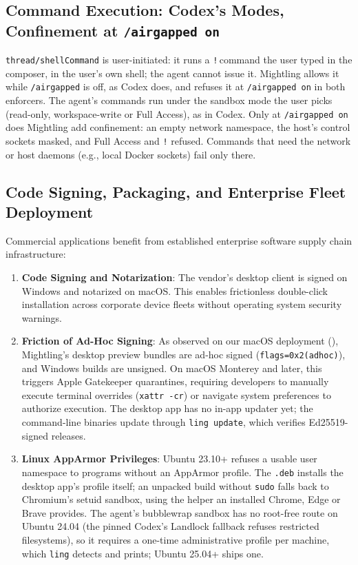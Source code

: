 \documentclass[11pt]{article}
\newcommand{\code}[1]{\texttt{#1}}
\newcommand{\agon}{\code{/airgapped on}}
\begin{document}
\subsection{Command Execution: Codex's Modes, Confinement at \agon}

\code{thread/shellCommand} is user-initiated: it runs a \code{!}\,command the user typed in the composer, in the
user's own shell; the agent cannot issue it. Mightling allows it while \code{/airgapped} is off, as Codex does, and
refuses it at \agon{} in both enforcers. The agent's commands run under the sandbox mode the user picks (read-only,
workspace-write or Full Access), as in Codex. Only at \agon{} does Mightling add confinement: an empty network
namespace, the host's control sockets masked, and Full Access and \code{!} refused. Commands that need the network
or host daemons (e.g., local Docker sockets) fail only there.

\subsection{Code Signing, Packaging, and Enterprise Fleet Deployment}

Commercial applications benefit from established enterprise software supply chain infrastructure:
\begin{enumerate}
    \item \textbf{Code Signing and Notarization}: The vendor's desktop client is signed on Windows and notarized on
    macOS. This enables frictionless double-click installation across corporate device fleets without operating system
    security warnings.
    \item \textbf{Friction of Ad-Hoc Signing}: As observed on our macOS deployment (), Mightling's
    desktop preview bundles are ad-hoc signed (\code{flags=0x2(adhoc)}), and Windows builds are unsigned. On macOS Monterey
    and later, this triggers Apple Gatekeeper quarantines, requiring developers to manually execute terminal overrides
    (\code{xattr -cr}) or navigate system preferences to authorize execution. The desktop app has no in-app updater yet;
    the command-line binaries update through \code{ling update}, which verifies Ed25519-signed releases.
    \item \textbf{Linux AppArmor Privileges}: Ubuntu 23.10+ refuses a usable user namespace to programs without an
    AppArmor profile. The \code{.deb} installs the desktop app's profile itself; an unpacked build without \code{sudo}
    falls back to Chromium's setuid sandbox, using the helper an installed Chrome, Edge or Brave provides. The agent's
    bubblewrap sandbox has no root-free route on Ubuntu 24.04 (the pinned Codex's Landlock fallback refuses restricted
    filesystems), so it requires a one-time administrative profile per machine, which \code{ling} detects and prints;
    Ubuntu 25.04+ ships one.
\end{enumerate}
\end{document}
